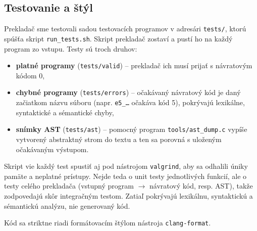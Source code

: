 \subsection{Testovanie a štýl}
Prekladač sme testovali sadou testovacích programov v adresári \texttt{tests/}, ktorú spúšťa skript \texttt{run\_tests.sh}. Skript prekladač zostaví a pustí ho na každý program zo vstupu. Testy sú troch druhov:
\begin{itemize}
    \item \textbf{platné programy} (\texttt{tests/valid}) -- prekladač ich musí prijať s návratovým kódom 0,
    \item \textbf{chybné programy} (\texttt{tests/errors}) -- očakávaný návratový kód je daný začiatkom názvu súboru (napr. \texttt{e5\_\ldots} očakáva kód 5), pokrývajú lexikálne, syntaktické a sémantické chyby,
    \item \textbf{snímky AST} (\texttt{tests/ast}) -- pomocný program \texttt{tools/ast\_dump.c} vypíše vytvorený abstraktný strom do textu a ten sa porovná s uloženým očakávaným výstupom.
\end{itemize}
Skript vie každý test spustiť aj pod nástrojom \texttt{valgrind}, aby sa odhalili úniky pamäte a neplatné prístupy. Nejde teda o unit testy jednotlivých funkcií, ale o testy celého prekladača (vstupný program $\rightarrow$ návratový kód, resp. AST), takže zodpovedajú skôr integračným testom. Zatiaľ pokrývajú lexikálnu, syntaktickú a sémantickú analýzu, nie generovaný kód.

Kód sa striktne riadi formátovacím štýlom nástroja \texttt{clang-format}.